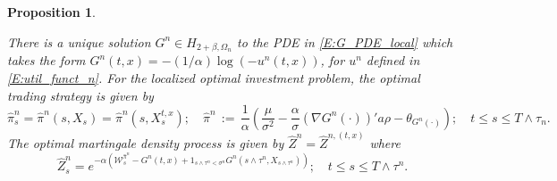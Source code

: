 \documentclass[11pt, letterpaper]{amsart}
\newtheorem{proposition}[theorem]{Proposition}
\theoremstyle{definition}
\theoremstyle{remark}
\numberwithin{equation}{section}
\newcommand{\We}{\mathcal{W}}
\newcommand{\hz}{\hat{Z}}
\newcommand{\hpi}{\hat{\pi}}
\newcommand{\dfn}{\, := \,}
\begin{document}
\begin{proposition}\label{P:opt_invest_local}

There is a unique solution $G^n\in H_{2+\beta,\Omega_n}$ to the PDE in \eqref{E:G_PDE_local} which takes the form $G^n(t,x) = -(1/\alpha)\log\left(-u^n(t,x)\right)$, for $u^n$ defined in \eqref{E:util_funct_n}.  For the localized optimal investment problem, the optimal trading strategy is given by
\begin{equation}\label{E:opt_pi_n}
\hpi^n_s  = \hpi^n(s,X_s) = \hpi^n(s,X^{t,x}_s);\quad \hpi^n \dfn \frac{1}{\alpha}\left(\frac{\mu}{\sigma^2} - \frac{\alpha}{\sigma}(\nabla G^n(\cdot))'a\rho - \theta_{G^n(\cdot)}\right);\quad t\leq s\leq T\wedge\tau_n.
\end{equation}
The optimal martingale density process is given by $\hz^n = \hz^{n,(t,x)}$ where
\begin{equation}\label{E:hat_Z_n}
\hz^n_s = e^{-\alpha\left(\We^{\hpi^n}_s - G^n(t,x) + 1_{s\wedge\tau^n < \sigma^n} G^n(s\wedge\tau^n,X_{s\wedge\tau^n}) \right)};\quad t\leq s\leq T\wedge\tau^n.
\end{equation}

\end{proposition}
\end{document}
